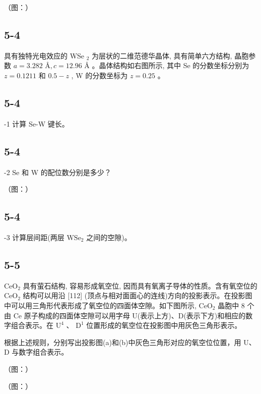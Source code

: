 （图：）

\subsection*{5-4}
具有独特光电效应的 WSe $_2$ 为层状的二维范德华晶体, 具有简单六方结构, 晶胞参数 $a = 3.282 \text{ Å}, c = 12.96 \text{ Å}$ 。晶体结构如右图所示, 其中 Se 的分数坐标分别为 $z = 0.1211$ 和 $0.5 - z$ , W 的分数坐标为 $z = 0.25$ 。

\subsection*{5-4}
-1 计算 Se-W 键长。

\subsection*{5-4}
-2 Se 和 W 的配位数分别是多少？

（图：）

\subsection*{5-4}
-3 计算层间距(两层 $\mathrm{WSe}_2$ 之间的空隙)。

\subsection*{5-5}
$\mathrm{CeO}_{2}$ 具有萤石结构, 容易形成氧空位, 因而具有氧离子导体的性质。含有氧空位的 $\mathrm{CeO}_{2}$ 结构可以用沿 [112] (顶点与相对面面心的连线)方向的投影表示。在投影图中可以用三角形代表形成了氧空位的四面体空隙。如下图所示, $\mathrm{CeO}_{2}$ 晶胞中 8 个由 Ce 原子构成的四面体空隙可以用字母 U(表示上方)、D(表示下方)和相应的数字组合表示。在 $\mathrm{U}^{4}$ 、 $\mathrm{D}^{1}$ 位置形成的氧空位在投影图中用灰色三角形表示。

根据上述规则，分别写出投影图(a)和(b)中灰色三角形对应的氧空位位置，用 U、D 与数字组合表示。

（图：）

（图：）
